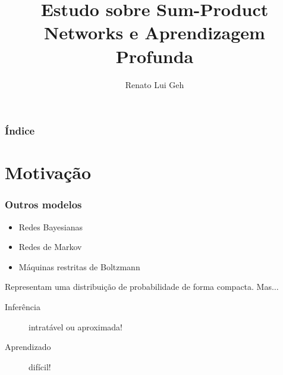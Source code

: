 \documentclass[10pt]{beamer}
\title{Estudo sobre Sum-Product Networks e Aprendizagem Profunda}
\author{Renato Lui Geh}
\institute[IME-USP] {%
  Instituto de Matemática e Estatística\\
  Universidade de São Paulo
}
\theoremstyle{plain}
\begin{document}
\frame{\titlepage}

\begin{frame}
  \frametitle{Índice}
  \tableofcontents
\end{frame}


\section{Motivação}

\begin{frame}
  \frametitle{Outros modelos}
  \begin{itemize}
    \item Redes Bayesianas
    \item Redes de Markov
    \item Máquinas restritas de Boltzmann
  \end{itemize}
  Representam uma distribuição de probabilidade de forma compacta. Mas$\ldots$
  \begin{description}
    \item[Inferência] intratável ou aproximada!
    \item[Aprendizado] difícil!
  \end{description}
\end{frame}
\end{document}
